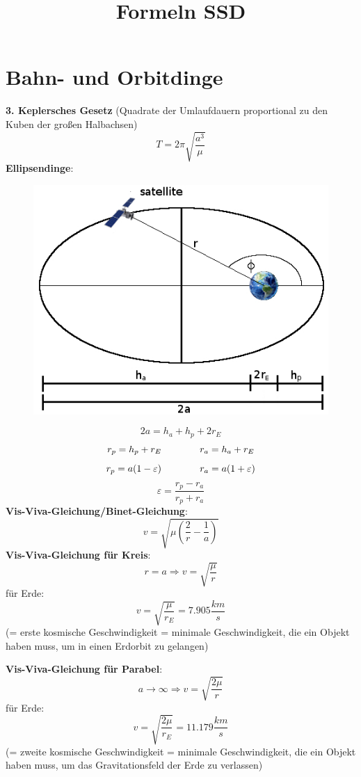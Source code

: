 \documentclass[a4paper,10pt]{article}
\title{Formeln SSD}
\author{}
\date{}
\newcommand{\f}{\textbf}
\begin{document}
\maketitle

\section*{Bahn- und Orbitdinge}
\f{3. Keplersches Gesetz} (Quadrate der Umlaufdauern proportional zu den Kuben der großen Halbachsen)
\[T = 2\pi\sqrt{\frac{a^3}{\mu}}\]
\f{Ellipsendinge}:
\begin{figure}[!ht]
 \centering
 \includegraphics[scale=0.5]{pic1.png}
\end{figure}
\[2a = h_a + h_p + 2r_E\]
\[r_p = h_p + r_E \text{\qquad \qquad} r_a = h_a + r_E\]
\[r_p = a(1-\varepsilon) \text{\qquad \qquad} r_a = a(1+\varepsilon)\]
\[\varepsilon = \frac{r_p - r_a}{r_p + r_a}\]
\f{Vis-Viva-Gleichung/Binet-Gleichung}:
\[v = \sqrt{\mu\left(\frac{2}{r} -\frac{1}{a}\right)}\]
\f{Vis-Viva-Gleichung für Kreis}:
\[r = a \Rightarrow v = \sqrt{\frac{\mu}{r}} \]
für Erde: 
\[v = \sqrt{\frac{\mu}{r_E}} = 7.905 \frac{km}{s}\]
(= erste kosmische Geschwindigkeit = minimale Geschwindigkeit, die ein Objekt haben muss, um in einen Erdorbit zu gelangen) \\
\vspace*{5pt}

\noindent \f{Vis-Viva-Gleichung für Parabel}:
\[a \rightarrow \infty \Rightarrow v = \sqrt{\frac{2\mu}{r}} \]
für Erde: 
\[v = \sqrt{\frac{2\mu}{r_E}} = 11.179 \frac{km}{s}\]
(= zweite kosmische Geschwindigkeit = minimale Geschwindigkeit, die ein Objekt haben muss, um das Gravitationsfeld der Erde zu verlassen) \\
\vspace*{5pt}
\end{document}
